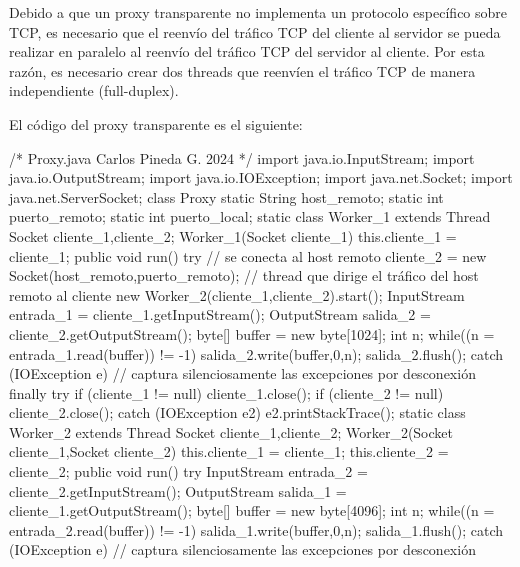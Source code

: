 \documentclass[11pt,a4paper,oneside]{book}
\begin{document}
Debido a que un proxy transparente no implementa un protocolo específico sobre TCP, es necesario que el reenvío del tráfico TCP del cliente al servidor se pueda realizar en paralelo al reenvío del tráfico TCP del servidor al cliente. Por esta razón, es necesario crear dos threads que reenvíen el tráfico TCP de manera independiente (full-duplex).

El código del proxy transparente es el siguiente:

\begin{SourceCode}
/*
  Proxy.java
  Carlos Pineda G. 2024
*/
import java.io.InputStream;
import java.io.OutputStream;
import java.io.IOException;
import java.net.Socket;
import java.net.ServerSocket;
class Proxy
{
  static String host_remoto;
  static int puerto_remoto;
  static int puerto_local;
  static class Worker_1 extends Thread
  {
    Socket cliente_1,cliente_2;
    Worker_1(Socket cliente_1)
    {
      this.cliente_1 = cliente_1;
    }
    public void run()
    {
      try
      {
        // se conecta al host remoto
        cliente_2 = new Socket(host_remoto,puerto_remoto);
        // thread que dirige el tráfico del host remoto al cliente
        new Worker_2(cliente_1,cliente_2).start();
        InputStream entrada_1 = cliente_1.getInputStream();
        OutputStream salida_2 = cliente_2.getOutputStream();
        byte[] buffer = new byte[1024];
        int n;
        while((n = entrada_1.read(buffer)) != -1)
        {
          salida_2.write(buffer,0,n);
          salida_2.flush();
        }
      }
      catch (IOException e)
      {
        // captura silenciosamente las excepciones por desconexión
      }
      finally
      {
        try
        {
          if (cliente_1 != null) cliente_1.close();
          if (cliente_2 != null) cliente_2.close();
        }
        catch (IOException e2)
        {
          e2.printStackTrace();
        }
      }
    }
  }
  static class Worker_2 extends Thread
  {
    Socket cliente_1,cliente_2;
    Worker_2(Socket cliente_1,Socket cliente_2)
    {
      this.cliente_1 = cliente_1;
      this.cliente_2 = cliente_2;
    }
    public void run()
    {
      try
      {
        InputStream entrada_2 = cliente_2.getInputStream();
        OutputStream salida_1 = cliente_1.getOutputStream();
        byte[] buffer = new byte[4096];
        int n;
        while((n = entrada_2.read(buffer)) != -1)
        {
          salida_1.write(buffer,0,n);
          salida_1.flush();
        } 
      }
      catch (IOException e)
      {
        // captura silenciosamente las excepciones por desconexión
      }
}}}
\end{SourceCode}
\end{document}
